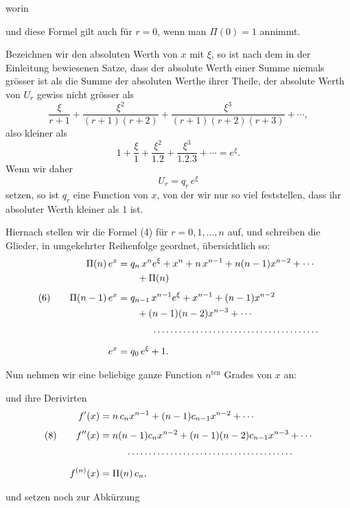 worin


und diese Formel gilt auch für $r=0$, wenn man $\Pi(0)=1$ annimmt.

Bezeichnen wir den absoluten Werth von $x$ mit $\xi$, so ist nach dem in der Einleitung bewiesenen Satze, dass der absolute Werth einer Summe niemals grösser ist als die Summe der absoluten Werthe ihrer Theile, der absolute Werth von $U_r$ gewiss nicht grösser als
\[
\frac{\xi}{r+1}+\frac{\xi^2}{(r+1)(r+2)}+\frac{\xi^3}{(r+1)(r+2)(r+3)}+\cdots,
\]
also kleiner als
\[
1+\frac{\xi}{1}+\frac{\xi^2}{1.2}+\frac{\xi^3}{1.2.3}+\cdots=e^{\xi}.
\]
Wenn wir daher
\[
U_r = q_r\,e^{\xi}
\]
setzen, so ist $q_r$ eine Function von $x$, von der wir nur so viel feststellen, dass ihr absoluter Werth kleiner als 1 ist.

Hiernach stellen wir die Formel (4) für $r=0,1,\ldots,n$ auf, und schreiben die Glieder, in umgekehrter Reihenfolge geordnet, übersichtlich so:
\[
\begin{aligned}
\Pi(n)\,e^x &= q_n\,x^n e^{\xi} + x^n + n\,x^{n-1} + n(n-1)x^{n-2}+\cdots\\
&\qquad{}+\Pi(n)\\[4pt]
(6)\qquad \Pi(n-1)\,e^x &= q_{n-1}\,x^{n-1}e^{\xi}+x^{n-1}+(n-1)x^{n-2}\\
&\qquad{}+(n-1)(n-2)x^{n-3}+\cdots\\[4pt]
&\hphantom{\Pi(n)\,e^x{}}\;\cdots\cdots\cdots\cdots\cdots\cdots\cdots\cdots\cdots\cdots\cdots\cdots\cdots\\[4pt]
e^x &= q_0\,e^{\xi}+1.
\end{aligned}
\]

Nun nehmen wir eine beliebige ganze Function $n^{\text{ten}}$ Grades von $x$ an:


und ihre Derivirten
\[
\begin{aligned}
f'(x) &= n\,c_n x^{n-1} + (n-1)c_{n-1}x^{n-2}+\cdots\\[4pt]
(8)\qquad f''(x) &= n(n-1)c_n x^{n-2}+(n-1)(n-2)c_{n-1}x^{n-3}+\cdots\\[4pt]
&\hphantom{f''(x){}}\;\cdots\cdots\cdots\cdots\cdots\cdots\cdots\cdots\cdots\cdots\cdots\cdots\cdots\\[4pt]
f^{(n)}(x) &= \Pi(n)\,c_n,
\end{aligned}
\]

und setzen noch zur Abkürzung

